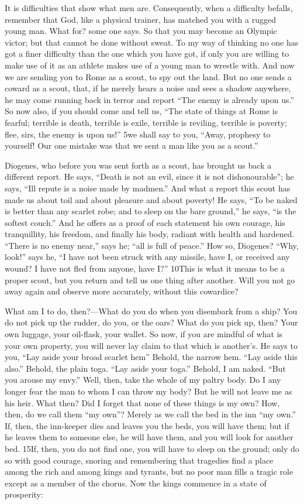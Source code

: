 It is difficulties that show what men are. Consequently, when a difficulty befalls, remember that God, like a physical trainer, has matched you with a rugged young man. What for? some one says. So that you may become an Olympic victor; but that cannot be done without sweat. To my way of thinking no one has got a finer difficulty than the one which you have got, if only you are willing to make use of it as an athlete makes use of a young man to wrestle with. And now we are sending you to Rome as a scout, to spy out the land. But no one sends a coward as a scout, that, if he merely hears a noise and sees a shadow anywhere, he may come running back in terror and report ``The enemy is already upon us.'' So now also, if you should come and tell us, ``The state of things at Rome is fearful; terrible is death, terrible is exile, terrible is reviling, terrible is poverty; flee, sirs, the enemy is upon us!'' 5we shall say to you, ``Away, prophesy to yourself! Our one mistake was that we sent a man like you as a scout.''

Diogenes, who before you was sent forth as a scout, has brought us back a different report. He says, ``Death is not an evil, since it is not dishonourable''; he says, ``Ill repute is a noise made by madmen.'' And what a report this scout has made us about toil and about pleasure and about poverty! He says, ``To be naked is better than any scarlet robe; and to sleep on the bare ground,'' he says, ``is the softest couch.'' And he offers as a proof of each statement his own courage, his tranquillity, his freedom, and finally his body, radiant with health and hardened. ``There is no enemy near,'' says he; ``all is full of peace.'' How so, Diogenes? ``Why, look!'' says he, ``I have not been struck with any missile, have I, or received any wound? I have not fled from anyone, have I?'' 10This is what it means to be a proper scout, but you return and tell us one thing after another. Will you not go away again and observe more accurately, without this cowardice?

What am I to do, then?—What do you do when you disembark from a ship? You do not pick up the rudder, do you, or the oars? What do you pick up, then? Your own luggage, your oil-flask, your wallet. So now, if you are mindful of what is your own property, you will never lay claim to that which is another's. He says to you, ``Lay aside your broad scarlet hem'' Behold, the narrow hem. ``Lay aside this also.'' Behold, the plain toga. ``Lay aside your toga.'' Behold, I am naked. ``But you arouse my envy.'' Well, then, take the whole of my paltry body. Do I any longer fear the man to whom I can throw my body? But he will not leave me as his heir. What then? Did I forget that none of these things is my own? How, then, do we call them ``my own''? Merely as we call the bed in the inn ``my own.'' If, then, the inn-keeper dies and leaves you the beds, you will have them; but if he leaves them to someone else, he will have them, and you will look for another bed. 15If, then, you do not find one, you will have to sleep on the ground; only do so with good courage, snoring and remembering that tragedies find a place among the rich and among kings and tyrants, but no poor man fills a tragic role except as a member of the chorus. Now the kings commence in a state of prosperity:

